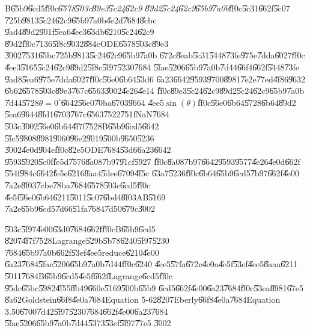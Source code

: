 B\U{65b9}\U{6cd5}\U{ff0c}\emph{\U{6578}\U{503c}\U{89e3}\U{5c24}\U{62c9}%
\U{89d2}\U{5c24}\U{62c9}\U{65b9}\U{7a0b}}\U{ff0c}\U{5c31}\U{662f}\U{5c07}%
\U{725b}\U{9813}\U{5c24}\U{62c9}\U{65b9}\U{7a0b}\U{4e2d}\U{7684}\U{8cbc}%
\U{9ad4}\U{89d2}\U{901f}\U{5ea6}\U{4ee3}\U{63db}\U{6210}\U{5c24}\U{62c9}%
\U{89d2}\U{ff0c}\U{7136}\U{5f8c}\U{9032}\U{884c}ODE\U{6578}\U{503c}\U{89e3}%
\U{3002}\U{7531}\U{65bc}\U{725b}\U{9813}\U{5c24}\U{62c9}\U{65b9}\U{7a0b}%
\U{672c}\U{8eab}\U{5c31}\U{5448}\U{73fe}\U{975e}\U{7dda}\U{6027}\U{ff0c}%
\U{4ee3}\U{5165}\U{5c24}\U{62c9}\U{89d2}\U{5f8c}\U{5f97}\U{5230}\U{7684}%
\U{5fae}\U{5206}\U{65b9}\U{7a0b}\U{7d44}\U{66f4}\U{662f}\U{5448}\U{73fe}%
\U{9ad8}\U{5ea6}\U{975e}\U{7dda}\U{6027}\U{ff0c}\U{56e0}\U{6b64}\U{53d6}%
\U{6a23}\U{6642}\U{9593}\U{9700}\U{8981}\U{7e2e}\U{77ed}\U{4f86}\U{9632}%
\U{6b62}\U{6578}\U{503c}\U{89e3}\U{767c}\U{6563}\U{3002}\U{4e26}\U{4e14}%
\U{ff0c}\U{89e3}\U{5c24}\U{62c9}\U{89d2}\U{5c24}\U{62c9}\U{65b9}\U{7a0b}%
\U{7d44}\U{5728}$\theta =0^{\circ }$\U{6642}\U{56e0}\U{70ba}\U{6703}\U{9664}%
\U{4ee5}$\sin (\theta )$\U{ff0c}\U{56e0}\U{6b64}\U{5728}\U{6b64}\U{89d2}%
\U{5ea6}\U{9644}\U{8fd1}\U{6703}\U{767c}\U{6563}\U{7522}\U{751f}NaN\U{7684}%
\U{503c}\U{3002}\U{56e0}\U{6b64}\U{4f7f}\U{7528}B\U{65b9}\U{6cd5}\U{6642}%
\U{5fc5}\U{9808}\U{8981}\U{9060}\U{96e2}\U{9019}\U{500b}\U{9650}\U{5236}%
\U{3002}\U{4e0d}\U{904e}\U{ff0c}\U{82e5}ODE\U{7684}\U{53d6}\U{6a23}\U{6642}%
\U{9593}\U{5920}\U{5c0f}\U{fe5d}\U{7576}\U{8a08}\U{7b97}\U{91cf}\U{5927}%
\U{ff0c}\U{8a08}\U{7b97}\U{6642}\U{9593}\U{9577}\U{4e26}\U{4e0d}\U{662f}%
\U{554f}\U{984c}\U{6642}\U{fe5e}\U{6216}\U{8aa4}\U{5dee}\U{6709}\U{4f5c}%
\U{63a7}\U{5236}\U{ff0c}\U{6b64}\U{65b9}\U{6cd5}\U{7b97}\U{662f}\U{4e00}%
\U{7a2e}\U{8f03}\U{7cbe}\U{78ba}\U{7684}\U{6578}\U{503c}\U{6cd5}\U{ff0c}%
\U{4e5f}\U{56e0}\U{6b64}\U{6211}\U{5011}\U{5c07}\U{6bd4}\U{8f03}AB\U{5169}%
\U{7a2e}\U{65b9}\U{6cd5}\U{7d66}\U{51fa}\U{7684}\U{7d50}\U{679c}\U{3002}

\bigskip

\U{503c}\U{5f97}\U{4e00}\U{63d0}\U{7684}\U{662f}\U{ff0c}B\U{65b9}\U{6cd5}%
\U{8207}\U{4f7f}\U{7528}Lagrange\U{529b}\U{5b78}\U{6240}\U{5f97}\U{5230}%
\U{7684}\U{65b9}\U{7a0b}\U{662f}\U{53ef}\U{4ee5}reduce\U{6210}\U{4e00}%
\U{6a23}\U{7684}\U{5fae}\U{5206}\U{65b9}\U{7a0b}\U{7d44}\U{ff0c}\U{6240}%
\U{4ee5}\U{57fa}\U{672c}\U{4e0a}\U{4e5f}\U{53ef}\U{4ee5}\U{8aaa}\U{6211}%
\U{5011}\U{7684}B\U{65b9}\U{6cd5}\U{4e5f}\U{662f}Lagrange\U{6cd5}\U{ff0c}%
\U{95dc}\U{65bc}\U{5982}\U{4f55}\U{8b49}\U{660e}\U{5169}\U{500b}\U{65b9}%
\U{6cd5}\U{662f}\U{4e00}\U{6a23}\U{7684}\U{ff0c}\U{53ea}\U{8981}\U{67e5}%
\U{8a62}Goldstein\U{66f8}\U{4e0a}\cite[Page 216]{goldstein}\U{7684}Equation
5-62\U{8207}Eberly\U{66f8}\U{4e0a}\cite[Page 158]{eberly}\U{7684}Equation
3.50\U{6700}\U{7d42}\U{5f97}\U{5230}\U{7684}\U{662f}\U{4e00}\U{6a23}\U{7684}%
\U{5fae}\U{5206}\U{65b9}\U{7a0b}\U{7d44}\U{5373}\U{53ef}\U{5f97}\U{77e5}%
\U{3002}

